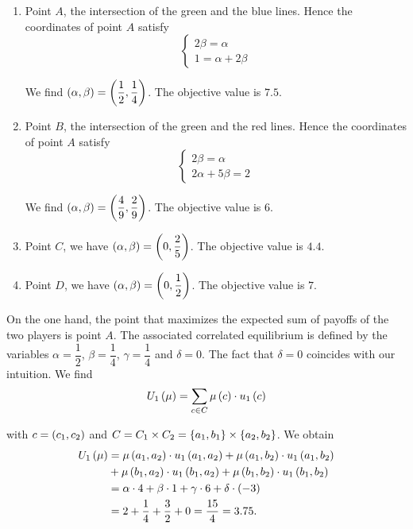 \begin{enumerate}
    \item Point $A$, the intersection of the green and the blue lines. Hence the coordinates of point $A$ satisfy
    \begin{equation*}
       \begin{cases}
        2 \beta = \alpha  \\
        1 = \alpha + 2 \beta
        \end{cases}
    \end{equation*}

    We find $\left(\alpha, \beta\right) = \left(\dfrac{1}{2}, \dfrac{1}{4}\right)$. The objective value is $7.5$.

    \item Point $B$, the intersection of the green and the red lines. Hence the coordinates of point $A$ satisfy
    \begin{equation*}
       \begin{cases}
        2 \beta = \alpha  \\
        2 \alpha + 5 \beta = 2
        \end{cases}
    \end{equation*}

    We find $\left(\alpha, \beta\right) = \left(\dfrac{4}{9}, \dfrac{2}{9}\right)$. The objective value is $6$.

    \item Point $C$, we have $\left(\alpha, \beta\right) = \left(0, \dfrac{2}{5}\right)$. The objective value is $4.4$.

    \item Point $D$, we have $\left(\alpha, \beta\right) = \left(0, \dfrac{1}{2}\right)$. The objective value is $7$.
\end{enumerate}

On the one hand, the point that maximizes the expected sum of payoffs of the two players is point $A$.
The associated correlated equilibrium is defined by the variables $\alpha = \dfrac{1}{2}$, $\beta = \dfrac{1}{4}$, $\gamma = \dfrac{1}{4}$ and $\delta = 0$. The fact that $\delta = 0$ coincides with our intuition.
We find 
\begin{align*}
    U_1 \left(\mu\right)
    = \sum_{c \in C} \mu \left(c\right) \cdot u_{1} \left(c\right)
\end{align*}

with $c = \left(c_1, c_2\right)$ and $C = C_1 \times C_2 = \left\{a_1, b_1\right\} \times \left\{a_2, b_2\right\}$. We obtain
\begin{align*}
    U_1 \left(\mu\right)
    &= \mu \left(a_1, a_2\right) \cdot u_{1} \left(a_1, a_2\right)
    + \mu \left(a_1, b_2\right) \cdot u_{1} \left(a_1, b_2\right) \\
    &+ \mu \left(b_1, a_2\right) \cdot u_{1} \left(b_1, a_2\right)
    + \mu \left(b_1, b_2\right) \cdot u_{1} \left(b_1, b_2\right) \\
    &= \alpha \cdot 4 + \beta \cdot 1 + \gamma \cdot 6 + \delta \cdot \left(-3\right) \\
    &= 2 + \dfrac{1}{4} + \dfrac{3}{2} + 0
    = \dfrac{15}{4} = 3.75.
\end{align*}


